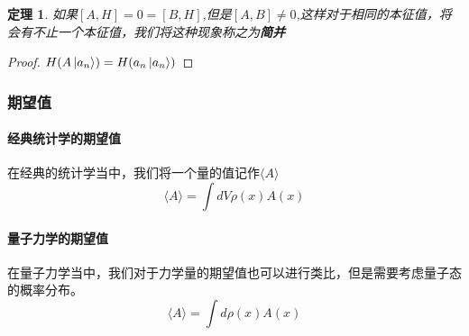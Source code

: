 \documentclass{article}
\newtheorem{theorem}{定理}
\begin{document}
\begin{theorem}
    如果$[A,H]=0=[B,H]$,但是$[A,B]\neq0$,这样对于相同的本征值，将会有不止一个本征值，我们将这种现象称之为\textbf{简并}
\end{theorem}

\begin{proof}
    $H(A\ket{a_n})=H(a_n\ket{a_n})$
\end{proof}

\subsubsection{期望值}
\paragraph{经典统计学的期望值}
在经典的统计学当中，我们将一个量的值记作$\langle A\rangle$
\begin{equation}
    \langle A\rangle=\int dV\rho(x)A(x)
\end{equation}
\paragraph{量子力学的期望值}
在量子力学当中，我们对于力学量的期望值也可以进行类比，但是需要考虑量子态的概率分布。
\begin{equation}
    \langle A\rangle=\int d\rho(x)A(x)
\end{equation}
\end{document}
